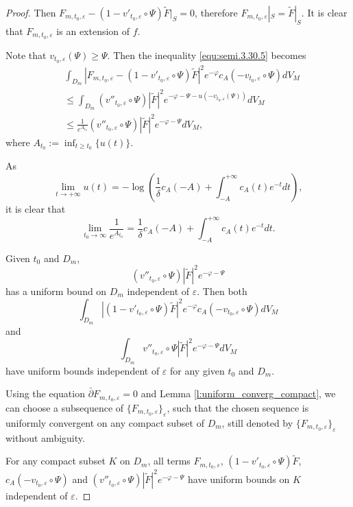 \begin{proof}
Then
$F_{m,t_0,\varepsilon}-(1-v'_{t_0,\varepsilon}\circ\Psi)\widetilde{F}|_{S}=0$,
therefore $F_{m,t_0,\varepsilon}|_{S}=\widetilde{F}|_{S}$. It is
clear that $F_{m,t_0,\varepsilon}$ is an extension of $f$.

Note that $v_{t_0,\varepsilon}(\Psi)\geq\Psi$. Then the inequality
\ref{equ:semi.3.30.5} becomes
\begin{equation}
\label{equ:semi.vector3.31.1}
\begin{split}
 &\int_{D_{m}}|F_{m,t_0,\varepsilon}-(1-v'_{t_0,\varepsilon}\circ\Psi)\widetilde{F}|^{2}
 e^{-\varphi}c_{A}(-v_{t_0,\varepsilon}\circ\Psi)dV_{M}
 \\&\leq
 \int_{D_m}(v''_{t_0,\varepsilon}\circ{\Psi})| \tilde{F}|^2e^{-\varphi-\Psi-u(-v_{t_{0},\varepsilon}(\Psi))}dV_M
 \\&\leq\frac{1}{e^{A_{t_0}}}(v''_{t_0,\varepsilon}\circ{\Psi})| \tilde{F}|^2e^{-\varphi-\Psi}dV_{M},
\end{split}
\end{equation}
where $A_{t_0}:=\inf_{t\geq t_0}\{u(t)\}$.

As
$$\lim_{t\to+\infty}u(t)=-\log(\frac{1}{\delta}c_{A}(-A)+\int_{-A}^{+\infty}c_{A}(t)e^{-t}dt),$$
it is clear that
$$\lim_{t_{0}\to\infty}\frac{1}{e^{A_{t_0}}}=\frac{1}{\delta}c_{A}(-A)+\int_{-A}^{+\infty}c_{A}(t)e^{-t}dt.$$

Given $t_0$ and $D_{m}$,
$$(v''_{t_0,\varepsilon}\circ\Psi)|\tilde{F}|^{2}e^{-\varphi-\Psi}$$
has a uniform bound on $D_{m}$ independent of $\varepsilon$. Then
both
$$\int_{D_m}|(1-v'_{t_0,\varepsilon}\circ\Psi)\tilde{F}|^{2}e^{-\varphi}c_{A}(-v_{t_0,\varepsilon}\circ\Psi)dV_{M}$$
and
$$\int_{D_m}v''_{t_0,\varepsilon}\circ\Psi|\tilde{F}|^{2}e^{-\varphi-\Psi}dV_{M}$$
have uniform bounds independent of $\varepsilon$ for any given $t_0$
and $D_m$.

Using the equation $\bar\partial F_{m,t_0,\varepsilon}=0$ and Lemma
\ref{l:uniform_converg_compact}, we can choose a subsequence of
$\{F_{m,t_0,\varepsilon}\}_{\varepsilon}$, such that the chosen
sequence is uniformly convergent on any compact subset of $D_m$,
still denoted by $\{F_{m,t_0,\varepsilon}\}_{\varepsilon}$ without
ambiguity.

For any compact subset $K$ on $D_m$, all terms
$F_{m,t_0,\varepsilon}$,
$(1-v'_{t_0,\varepsilon}\circ\Psi)\tilde{F}$,
$c_{A}(-v_{t_0,\varepsilon}\circ\Psi)$ and
$(v''_{t_0,\varepsilon}\circ\Psi)|\tilde{F}|^{2}e^{-\varphi-\Psi}$
have uniform bounds on $K$ independent of $\varepsilon$.


\end{proof}
